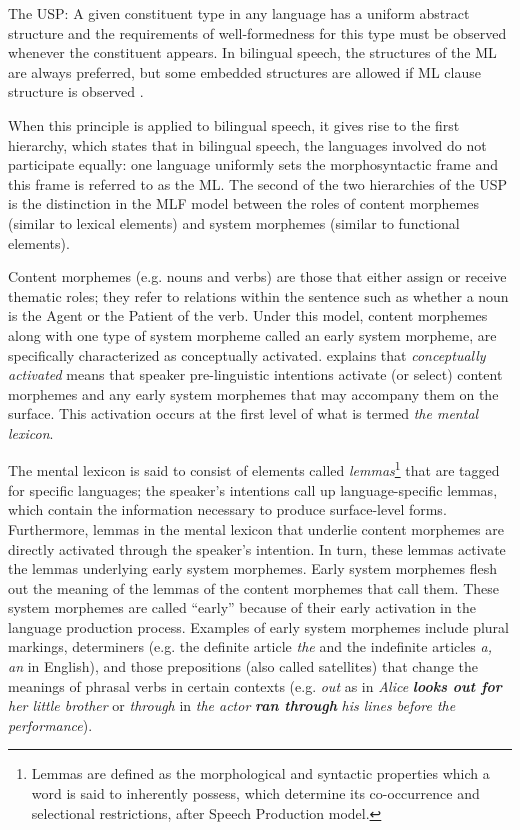 \documentclass[output=paper]{langsci/langscibook}
\begin{document}
The USP: A given constituent type in any language has a uniform abstract structure and the requirements of well-formedness for this type must be observed whenever the constituent appears. In bilingual speech, the structures of the ML are always preferred, but some embedded structures are allowed if ML clause structure is observed \citep[8--9]{MyersScotton2002}.

When this principle is applied to bilingual speech, it gives rise to the first hierarchy, which states that in bilingual speech, the languages involved do not participate equally: one language uniformly sets the morphosyntactic frame and this frame is referred to as the ML. The second of the two hierarchies of the USP is the distinction in the MLF model between the roles of content morphemes (similar to lexical elements) and system morphemes (similar to functional elements). 

Content morphemes (e.g. nouns and verbs) are those that either assign or receive thematic roles; they refer to relations within the sentence such as whether a noun is the Agent or the Patient of the verb. Under this model, content morphemes along with one type of system morpheme called an early system morpheme, are specifically characterized as conceptually activated. \citet{MyersScotton2002} explains that \textit{conceptually activated} means that speaker pre-linguistic intentions activate (or select) content morphemes and any early system morphemes that may accompany them on the surface. This activation occurs at the first level of what is termed \textit{the mental lexicon}.

The mental lexicon is said to consist of elements called \textit{lemmas}\footnote{Lemmas are defined as the morphological and syntactic properties which a word is said to inherently possess, which determine its co-occurrence and selectional restrictions, after  Speech Production model.} that are tagged for specific languages; the speaker’s intentions call up language-specific lemmas, which contain the information necessary to produce surface-level forms. Furthermore, lemmas in the mental lexicon that underlie content morphemes are directly activated through the speaker’s intention. In turn, these lemmas activate the lemmas underlying early system morphemes. Early system morphemes flesh out the meaning of the lemmas of the content morphemes that call them. These system morphemes are called “early” because of their early activation in the language production process. Examples of early system morphemes \citep[268]{MyersScotton2006} include plural markings, determiners (e.g. the definite article \textit{the} and the indefinite articles \textit{a, an} in English), and those prepositions (also called satellites) that change the meanings of phrasal verbs in certain contexts (e.g. \textit{out} as in \textit{Alice} \textbf{\textit{looks out for}}\textit{ her little brother} or \textit{through} in \textit{the actor} \textbf{\textit{ran through}}\textit{ his lines before the performance}).
\end{document}
